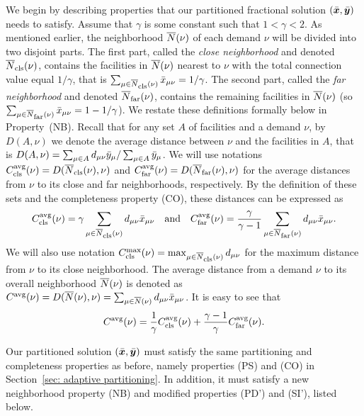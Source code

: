 \documentclass[oneside,final]{ucr}
\begin{document}
We begin by describing properties that our partitioned fractional
solution $(\bar{\boldsymbol{x}},\bar{\boldsymbol{y}})$ needs to satisfy. Assume that $\gamma$ is
some constant such that $1 < \gamma < 2$. As mentioned earlier,
the neighborhood ${\overline{N}}(\nu)$ of each demand $\nu$ will be divided
into two disjoint parts.  The first part, called the \emph{close
  neighborhood} and denoted ${\overline{N}}_{{\mbox{\scriptsize\rm cls}}}(\nu)$, contains the facilities
in ${\overline{N}}(\nu)$ nearest to $\nu$ with the total connection value
equal $1/\gamma$, that is $\sum_{\mu\in{\overline{N}}_{{\mbox{\scriptsize\rm cls}}}(\nu)} {\bar x}_{\mu\nu}
= 1/\gamma$.  The second part, called the \emph{far neighborhood} and
denoted ${\overline{N}}_{{\mbox{\scriptsize\rm far}}}(\nu)$, contains the remaining facilities in
${\overline{N}}(\nu)$ (so $\sum_{\mu\in{\overline{N}}_{{\mbox{\scriptsize\rm far}}}(\nu)} {\bar x}_{\mu\nu} = 1-1/\gamma$).  We
restate these definitions formally below in Property~(NB).  Recall
that for any set $A$ of facilities and a demand $\nu$, by
$D(A,\nu)$ we denote the average distance between $\nu$ and the
facilities in $A$, that is $D(A,\nu) =\sum_{\mu\in A}
d_{\mu\nu}{\bar y}_{\mu}/\sum_{\mu\in A} {\bar y}_{\mu}$.  We will use
notations $C_{{\mbox{\scriptsize\rm cls}}}^{{\mbox{\scriptsize\rm avg}}}(\nu)=D({\overline{N}}_{{\mbox{\scriptsize\rm cls}}}(\nu),\nu)$ and
$C_{{\mbox{\scriptsize\rm far}}}^{{\mbox{\scriptsize\rm avg}}}(\nu)=D({\overline{N}}_{{\mbox{\scriptsize\rm far}}}(\nu),\nu)$ for the average distances from
$\nu$ to its close and far neighborhoods, respectively.  By the
definition of these sets and the completeness property (CO), these
distances can be expressed as
%
\begin{equation*}
C_{{\mbox{\scriptsize\rm cls}}}^{{\mbox{\scriptsize\rm avg}}}(\nu)=\gamma\sum_{\mu\in{\overline{N}}_{{\mbox{\scriptsize\rm cls}}}(\nu)}
			d_{\mu\nu}{\bar x}_{\mu\nu} \quad\text{and}\quad
C_{{\mbox{\scriptsize\rm far}}}^{{\mbox{\scriptsize\rm avg}}}(\nu)=\frac{\gamma}{\gamma-1}\sum_{\mu\in{\overline{N}}_{{\mbox{\scriptsize\rm far}}}(\nu)}
d_{\mu\nu}{\bar x}_{\mu\nu}. 
\end{equation*}
%
We will also use notation $C_{{\mbox{\scriptsize\rm cls}}}^{\max}(\nu)=\max_{\mu\in{\overline{N}}_{{\mbox{\scriptsize\rm cls}}}(\nu)}
d_{\mu\nu}$ for the maximum distance from $\nu$ to its close
neighborhood. The average distance from a demand $\nu$ to its overall
neighborhood ${\overline{N}}(\nu)$ is denoted as $C^{{\mbox{\scriptsize\rm avg}}}(\nu) =
D({\overline{N}}(\nu), \nu) = \sum_{\mu \in {\overline{N}}(\nu)} d_{\mu\nu}
{\bar x}_{\mu\nu}$. It is easy to see that
\begin{equation}
  C^{{\mbox{\scriptsize\rm avg}}}(\nu) = \frac{1}{\gamma} C_{{\mbox{\scriptsize\rm cls}}}^{{\mbox{\scriptsize\rm avg}}}(\nu) + \frac{\gamma -
    1}{\gamma} C_{{\mbox{\scriptsize\rm far}}}^{{\mbox{\scriptsize\rm avg}}}(\nu).
  \label{eqn:avg dist cls dist far dist}
\end{equation}

Our partitioned solution $(\bar{\boldsymbol{x}},\bar{\boldsymbol{y}})$ must satisfy the same
partitioning and completeness properties as before, namely properties
(PS) and (CO) in Section~\ref{sec: adaptive partitioning}.  In
addition, it must satisfy a new neighborhood property (NB) and modified
properties (PD') and (SI'), listed below.
\end{document}
